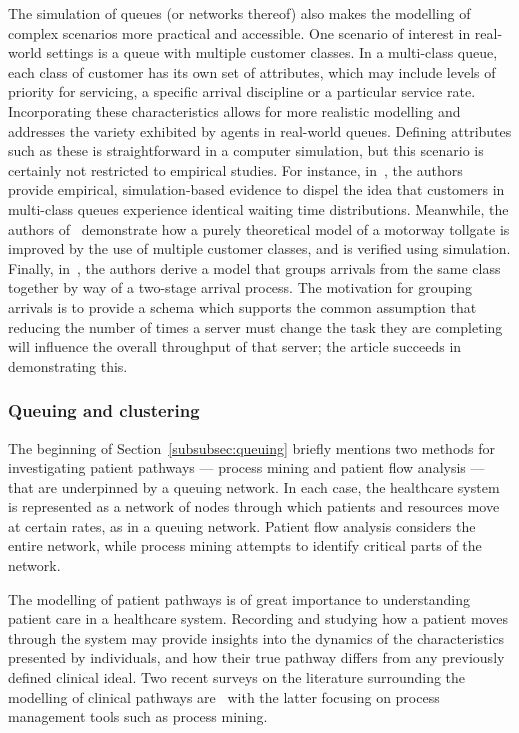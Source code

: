 The simulation of queues (or networks thereof) also makes the modelling of
complex scenarios more practical and accessible. One scenario of interest in
real-world settings is a queue with multiple customer classes. In a multi-class
queue, each class of customer has its own set of attributes, which may include
levels of priority for servicing, a specific arrival discipline or a particular
service rate. Incorporating these characteristics allows for more realistic
modelling and addresses the variety exhibited by agents in real-world queues.
Defining attributes such as these is straightforward in a computer simulation,
but this scenario is certainly not restricted to empirical studies. For
instance, in~\cite{RomeroSilva2017}, the authors provide empirical,
simulation-based evidence to dispel the idea that customers in multi-class
queues experience identical waiting time distributions. Meanwhile, the authors
of~\cite{Pompigna2020} demonstrate how a purely theoretical model of a motorway
tollgate is improved by the use of multiple customer classes, and is verified
using simulation. Finally, in~\cite{Reveil2014}, the authors derive a model that
groups arrivals from the same class together by way of a two-stage arrival
process. The motivation for grouping arrivals is to provide a schema which
supports the common assumption that reducing the number of times a server must
change the task they are completing will influence the overall throughput of
that server; the article succeeds in demonstrating this.

\subsubsection{Queuing and clustering}

The beginning of Section~\ref{subsubsec:queuing} briefly mentions two methods
for investigating patient pathways --- process mining and patient flow analysis
--- that are underpinned by a queuing network. In each case, the healthcare
system is represented as a network of nodes through which patients and resources
move at certain rates, as in a queuing network. Patient flow analysis considers
the entire network, while process mining attempts to identify critical parts of
the network. 

The modelling of patient pathways is of great importance to understanding
patient care in a healthcare system. Recording and studying how a patient moves
through the system may provide insights into the dynamics of the characteristics
presented by individuals, and how their true pathway differs from any previously
defined clinical ideal. Two recent surveys on the literature surrounding the
modelling of clinical pathways are~\cite{Aspland2019,DeRamonFernandez2019} with
the latter focusing on process management tools such as process mining.

